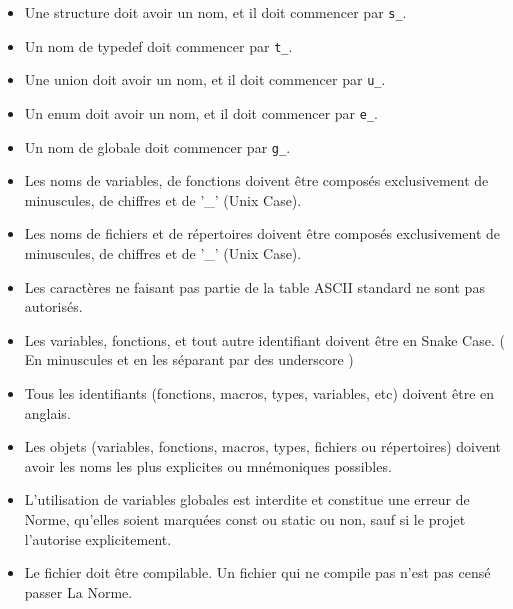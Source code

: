 \documentclass{42-fr}
\begin{document}
        \begin{itemize}

            \item Une structure doit avoir un nom, et il doit commencer par
                \texttt{s\_}.

            \item Un nom de typedef doit commencer par
                \texttt{t\_}.

            \item Une union doit avoir un nom, et il doit commencer par \texttt{u\_}.

            \item Un enum doit avoir un nom, et il doit commencer par \texttt{e\_}.

            \item Un nom de globale doit commencer par \texttt{g\_}.

            \item Les noms de variables, de fonctions doivent être composés exclusivement de 
                minuscules, de chiffres et de '\_' (Unix Case).

            \item Les noms de fichiers et de répertoires doivent être composés exclusivement de
                minuscules, de chiffres et de '\_' (Unix Case).

            \item Les caractères ne faisant pas partie de la table ASCII standard 
                ne sont pas autorisés.

            \item Les variables, fonctions, et tout autre identifiant doivent être en Snake Case.
                ( En minuscules et en les séparant par des underscore )

            \item Tous les identifiants (fonctions, macros, types, variables, etc) 
                doivent être en anglais.

            \item Les objets (variables, fonctions, macros, types, fichiers ou répertoires) 
                doivent avoir les noms les plus explicites ou mnémoniques possibles.
            
            \item L’utilisation de variables globales est interdite et constitue une erreur
                de Norme, qu’elles soient marquées const ou static ou non, sauf si le projet
                l’autorise explicitement.

            \item Le fichier doit être compilable. Un fichier qui ne compile pas n'est 
                pas censé passer La Norme.
        \end{itemize}
\newpage
\end{document}
